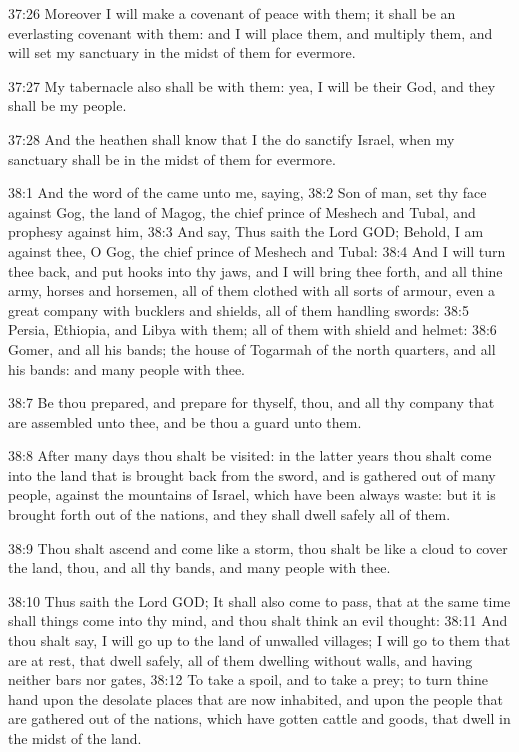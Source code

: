 37:26 Moreover I will make a covenant of peace with them; it shall be
an everlasting covenant with them: and I will place them, and multiply
them, and will set my sanctuary in the midst of them for evermore.

37:27 My tabernacle also shall be with them: yea, I will be their God,
and they shall be my people.

37:28 And the heathen shall know that I the \LORD do sanctify Israel,
when my sanctuary shall be in the midst of them for evermore.

38:1 And the word of the \LORD came unto me, saying, 38:2 Son of man,
set thy face against Gog, the land of Magog, the chief prince of
Meshech and Tubal, and prophesy against him, 38:3 And say, Thus saith
the Lord GOD; Behold, I am against thee, O Gog, the chief prince of
Meshech and Tubal: 38:4 And I will turn thee back, and put hooks into
thy jaws, and I will bring thee forth, and all thine army, horses and
horsemen, all of them clothed with all sorts of armour, even a great
company with bucklers and shields, all of them handling swords: 38:5
Persia, Ethiopia, and Libya with them; all of them with shield and
helmet: 38:6 Gomer, and all his bands; the house of Togarmah of the
north quarters, and all his bands: and many people with thee.

38:7 Be thou prepared, and prepare for thyself, thou, and all thy
company that are assembled unto thee, and be thou a guard unto them.

38:8 After many days thou shalt be visited: in the latter years thou
shalt come into the land that is brought back from the sword, and is
gathered out of many people, against the mountains of Israel, which
have been always waste: but it is brought forth out of the nations,
and they shall dwell safely all of them.

38:9 Thou shalt ascend and come like a storm, thou shalt be like a
cloud to cover the land, thou, and all thy bands, and many people with
thee.

38:10 Thus saith the Lord GOD; It shall also come to pass, that at the
same time shall things come into thy mind, and thou shalt think an
evil thought: 38:11 And thou shalt say, I will go up to the land of
unwalled villages; I will go to them that are at rest, that dwell
safely, all of them dwelling without walls, and having neither bars
nor gates, 38:12 To take a spoil, and to take a prey; to turn thine
hand upon the desolate places that are now inhabited, and upon the
people that are gathered out of the nations, which have gotten cattle
and goods, that dwell in the midst of the land.

